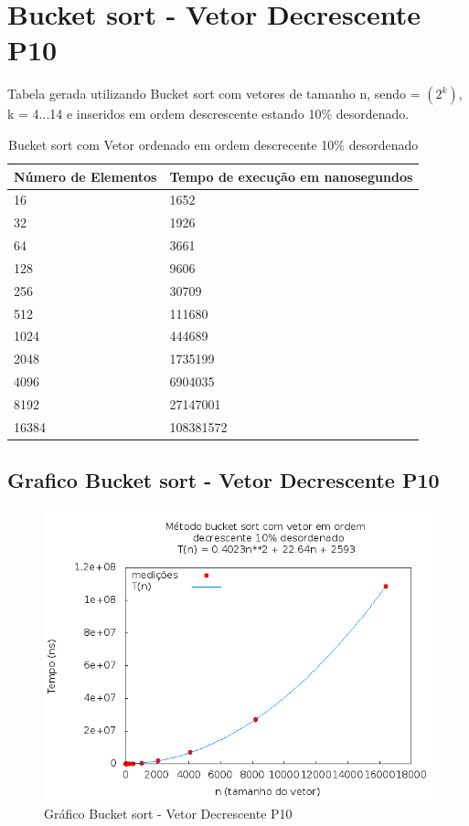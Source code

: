 \documentclass[12pt,a4paper,twoside]{report}
\begin{document}
\section{Bucket sort - Vetor Decrescente P10}
Tabela gerada utilizando Bucket sort com vetores de tamanho n, sendo = $(2^k)$, k = 4...14 e inseridos em ordem descrescente estando 10\% desordenado.

\begin{table}[H]
\centering
\caption{Bucket sort com Vetor ordenado em ordem descrecente 10\% desordenado}
\label{my-label}
\begin{tabular}{|l|l|}
\hline
\multicolumn{1}{|c|}{\textbf{Número de Elementos}} & \multicolumn{1}{c|}{\textbf{Tempo de execução em nanosegundos}} \\ \hline
16 & 1652 \\ \hline
32 & 1926 \\ \hline
64 & 3661 \\ \hline
128 & 9606 \\ \hline
256 & 30709 \\ \hline
512 & 111680 \\ \hline
1024 & 444689 \\ \hline
2048 & 1735199 \\ \hline
4096 & 6904035 \\ \hline
8192 & 27147001 \\ \hline
16384 & 108381572 \\ \hline
\end{tabular}
\end{table}

\subsection{Grafico Bucket sort - Vetor Decrescente P10}
\begin{figure}[H]
    \centering
    \includegraphics[width=0.7\linewidth]{graficos/Bucket/vIntDecrescenteP10/vIntDecrescenteP10.png}
  \caption{Gráfico Bucket sort - Vetor Decrescente P10}
\end{figure}
\end{document}
